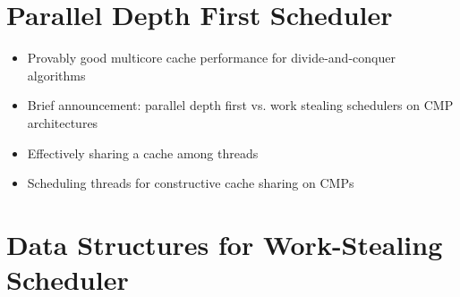 \section*{Parallel Depth First Scheduler}
\label{sec:lr-parallel-depth-first-scheduler}

\begin{itemize}
\item[\textbullet] Provably good multicore cache performance for
  divide-and-conquer algorithms \cite{Blelloch2008}
\item[\textbullet] Brief announcement: parallel depth first vs. work
  stealing schedulers on CMP architectures \cite{Liaskovitis2006}
\item[\textbullet] Effectively sharing a cache among threads
  \cite{Blelloch2004}
\item[\textbullet] Scheduling threads for constructive cache sharing
  on CMPs \cite{Chen2007}
\end{itemize}


\section*{Data Structures for Work-Stealing Scheduler}
\label{sec:lr-data-structures-for-work-stealing-scheduler}

